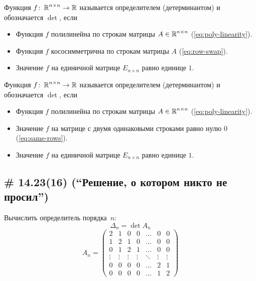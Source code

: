 \documentclass[a4paper,12pt]{article}
\theoremstyle{remark}
\begin{document}
  \begin{definition}
    Функция $f \colon \operatorname{\mathbb R}^{n \times n} \to \operatorname{\mathbb R}$ называется определителем (детерминантом) и обозначается $\det$, если
    \begin{itemize}
      \item Функция $f$ полилинейна по строкам матрицы $A \in \operatorname{\mathbb R}^{n \times n}$ (\ref{eq:poly-linearity}).
      \item Функция $f$ кососимметрична по строкам матрицы $A$ (\ref{eq:row-swap}).
      \item Значение $f$ на единичной матрице $E_{n \times n}$ равно единице $1$.
    \end{itemize}
  \end{definition}
  
  \begin{definition}
    Функция $f \colon \operatorname{\mathbb R}^{n \times n} \to \operatorname{\mathbb R}$ называется определителем (детерминантом) и обозначается $\det$, если
    \begin{itemize}
      \item Функция $f$ полилинейна по строкам матрицы $A \in \operatorname{\mathbb R}^{n \times n}$ (\ref{eq:poly-linearity}).
      \item Значение $f$ на матрице с двумя одинаковыми строками равно нулю $0$ (\ref{eq:same-rows}).
      \item Значение $f$ на единичной матрице $E_{n \times n}$ равно единице $1$.
    \end{itemize}
  \end{definition}
  
  
  \newpage  %
  
  \subsection{\# 14.23(16) (``Решение, о котором никто не просил'')}
  
  Вычислить определитель порядка~$n$:
  \[
    \Delta_n = \det A_n
  \]
  \[
    A_n = \begin{pmatrix}
      2      & 1      & 0      & 0      & \ldots & 0      & 0\\
      1      & 2      & 1      & 0      & \ldots & 0      & 0\\
      0      & 1      & 2      & 1      & \ldots & 0      & 0\\
      \vdots & \vdots & \vdots & \vdots & \ddots & \vdots & \vdots\\
      0      & 0      & 0      & 0      & \ldots & 2      & 1\\
      0      & 0      & 0      & 0      & \ldots & 1      & 2
    \end{pmatrix}
  \]
  
\end{document}
